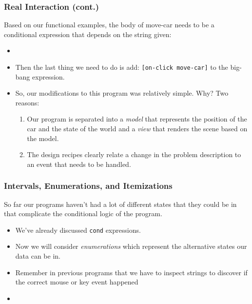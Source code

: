 \documentclass{beamer}
\begin{document}

\begin{frame}
  \frametitle{Real Interaction (cont.)}
  Based on our functional examples, the body of move-car needs to be a
  conditional expression that depends on the string given:
  \begin{itemize}
  \item<2-> \moveCar
  \item<3-> Then the last thing we need to do is add:
    \texttt{[on-click move-car]} to the big-bang expression.
  \item<4-> So, our modifications to this program was relatively simple. Why?
    Two reasons:
    \begin{enumerate}
    \item<5-> Our program is separated into a \emph{model} that represents
      the position of the car and the state of the world and a \emph{view}
      that renders the scene based on the model.
    \item<6-> The design recipes clearly relate a change in the problem description
      to an event that needs to be handled.
    \end{enumerate}
  \end{itemize}
\end{frame}


\begin{frame}
  \frametitle{Intervals, Enumerations, and Itemizations}
  So far our programs haven't had a lot of different states that they could
  be in that complicate the conditional logic of the program.
  \begin{itemize}
  \item<2-> We've already discussed \texttt{cond} expressions.
  \item<3-> Now we will consider \emph{enumerations} which represent the alternative states our data can be in.
  \item<4-> Remember in previous programs that we have to inspect strings
    to discover if the correct mouse or key event happened
  \item<5-> \mouseEnum
  \end{itemize}
\end{frame}
\end{document}
